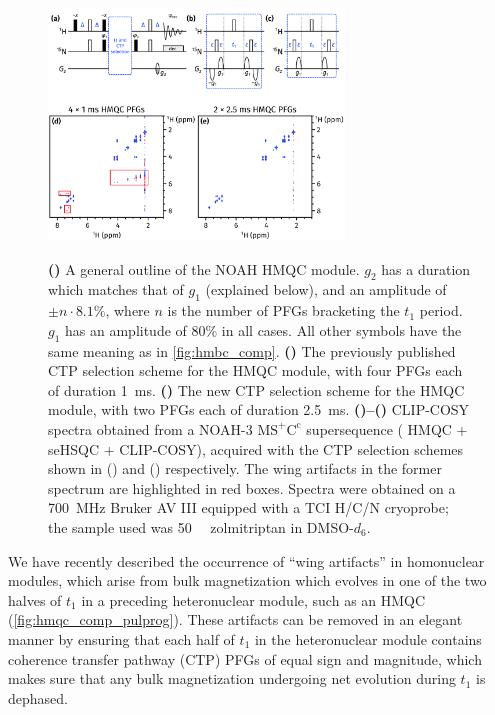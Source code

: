 \documentclass[a4paper,11pt]{article}
\newcommand{\carbon}{\ch{^{13}C}}
\newcommand{\nitrogen}{\ch{^{15}N}}
\newcommand*{\zolmi}{Spectra were obtained on a \SI{700}{\MHz} Bruker AV III equipped with a TCI H/C/N cryoprobe; the sample used was \SI{50}{\milli\molar} zolmitriptan in DMSO-\(d_6\).}
\begin{document}
\begin{refsection}
\begin{figure}[ht]
    \centering
    \includegraphics[width=0.7\textwidth]{hmqc_comp.png}
    {\label{fig:hmqc_comp_pulprog}}
    {\label{fig:hmqc_comp_pulprog_before}}
    {\label{fig:hmqc_comp_pulprog_after}}
    {\label{fig:hmqc_comp_spec_before}}
    {\label{fig:hmqc_comp_spec_after}}
    \caption{
        \textbf{()} A general outline of the NOAH \nitrogen{} HMQC module.
        \(g_2\) has a duration which matches that of \(g_1\) (explained below), and an amplitude of \(\pm n \cdot 8.1\%\), where \(n\) is the number of PFGs bracketing the \(t_1\) period.
        \(g_1\) has an amplitude of \(80\%\) in all cases.
        All other symbols have the same meaning as in \cref{fig:hmbc_comp}.
        \textbf{()} The previously published CTP selection scheme for the HMQC module, with four PFGs each of duration \SI{1}{ms}.
        \textbf{()} The new CTP selection scheme for the HMQC module, with two PFGs each of duration \SI{2.5}{ms}.
        \textbf{()--()} CLIP-COSY spectra obtained from a NOAH-3 \(\mathrm{MS^+C^c}\) supersequence (\nitrogen{} HMQC + \carbon{} seHSQC + CLIP-COSY), acquired with the CTP selection schemes shown in () and () respectively.
        The wing artifacts in the former spectrum are highlighted in red boxes.
        \zolmi{}
    }
    \label{fig:hmqc_comp}
\end{figure}

We have recently described the occurrence of ``wing artifacts'' in homonuclear modules, which arise from bulk magnetization which evolves in one of the two halves of \(t_1\) in a preceding heteronuclear module, such as an HMQC (\cref{fig:hmqc_comp_pulprog}).\autocite{Yong2021JMR}
These artifacts can be removed in an elegant manner by ensuring that each half of \(t_1\) in the heteronuclear module contains coherence transfer pathway (CTP) PFGs of equal sign and magnitude, which makes sure that any bulk magnetization undergoing net evolution during \(t_1\) is dephased.


\end{refsection}
\end{document}
